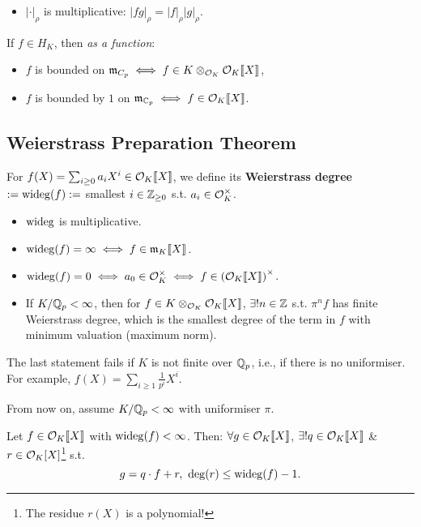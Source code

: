 \begin{itemize}
    \item $|\cdot|_\rho$ is multiplicative: $|fg|_{\rho} = |f|_\rho|g|_\rho$.
\end{itemize}

\begin{example}
    If $f\in H_K$, then \textit{as a function}:\begin{itemize}
        \item $f$ is bounded on $\mathfrak{m}_{C_p}\iff f\in K\otimes_{\mathcal{O}_K}\mathcal{O}_K\llbracket X \rrbracket$,
        \item $f$ is bounded by $1$ on $\mathfrak{m}_{\mathbb{C}_p}\iff f\in\mathcal{O}_K\llbracket X \rrbracket$.
    \end{itemize}
\end{example}

\subsection{Weierstrass Preparation Theorem}
For $f(X) = \sum_{i\ge 0}a_iX^i\in\mathcal{O}_K\llbracket X \rrbracket$, we define its \textbf{Weierstrass degree} $:= \operatorname{wideg}(f) :=$ smallest $i\in\mathbb{Z}_{\ge 0}$ s.t. $a_i\in\mathcal{O}_K^\times$.
\begin{itemize}
    \item $\operatorname{wideg}$ is multiplicative.
    \item $\operatorname{wideg}(f) = \infty\iff f\in\mathfrak{m}_{K}\llbracket X \rrbracket$.
    \item $\operatorname{wideg}(f) = 0\iff a_0\in\mathcal{O}_K^\times\iff f\in\left( \mathcal{O}_K\llbracket X \rrbracket \right)^\times$.
    \item If $K/\mathbb{Q}_p < \infty$, then for $f\in K\otimes_{\mathcal{O}_K}\mathcal{O}_K\llbracket X \rrbracket$,
    $\exists ! n\in\mathbb{Z}$ s.t. $\pi^n f$ has finite Weierstrass degree, which is the smallest degree of the term in $f$ with minimum valuation (maximum norm).
\end{itemize}
\begin{remark}
    The last statement fails if $K$ is not finite over $\mathbb{Q}_p$, i.e., if there is no uniformiser. For example, $f(X) = \sum_{i\ge 1}\frac{1}{p^i}X^i$.
\end{remark}
From now on, assume $K/\mathbb{Q}_p < \infty$ with uniformiser $\pi$.
\begin{proposition}
    \label{Euclidean division for power series}
    Let $f\in\mathcal{O}_K\llbracket X \rrbracket$ with $\operatorname{wideg}(f) < \infty$.
    Then: $\forall g\in \mathcal{O}_K\llbracket X \rrbracket$, $\exists ! q\in \mathcal{O}_K\llbracket X \rrbracket$ \& $r\in \mathcal{O}_K[X]$\footnote{The residue $r(X)$ is a polynomial!} s.t. \[g = q\cdot f + r,\ \deg(r)\le \operatorname{wideg}(f) - 1.\]
\end{proposition}
